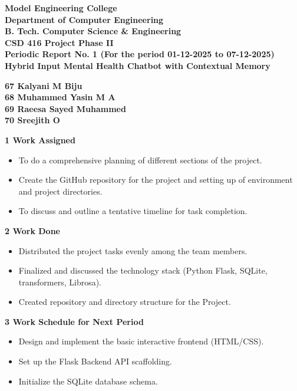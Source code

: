 \documentclass[12pt,a4paper]{article}
\begin{document}

\begin{center}
{\Large \textbf{Model Engineering College}}\\[0.2em]
{\large \textbf{Department of Computer Engineering}}\\[0.2em]
{\large \textbf{B. Tech. Computer Science \& Engineering}}\\[0.2em]
{\large \textbf{CSD 416 Project Phase II}}\\[1em]
{\large \textbf{Periodic Report No. 1 (For the period 01-12-2025 to 07-12-2025)}}\\[1.5em]

{\Large \textbf{Hybrid Input Mental Health Chatbot with Contextual Memory}}\\[0.2em]

\end{center}

\begin{center}
\textbf{67  Kalyani M Biju\\
68 Muhammed Yasin M A\\
69 Raeesa Sayed Muhammed\\
70 Sreejith O\\[1.5em]}
\end{center}

\noindent\textbf{1 \quad Work Assigned}
\begin{itemize}
    \item To do a comprehensive planning of different sections of the project.
    \item Create the GitHub repository for the project and setting up of environment and project directories.
    \item To discuss and outline a tentative timeline for task completion.
\end{itemize}

\noindent\textbf{2 \quad Work Done}
\begin{itemize}
    \item Distributed the project tasks evenly among the team members.
    \item Finalized and discussed the technology stack (Python Flask, SQLite, transformers, Librosa).
    \item Created repository and directory structure for the Project.
\end{itemize}

\noindent\textbf{3 \quad Work Schedule for Next Period}
\begin{itemize}
    \item Design and implement the basic interactive frontend (HTML/CSS).
    \item Set up the Flask Backend API scaffolding.
    \item Initialize the SQLite database schema.
\end{itemize}
\end{document}
